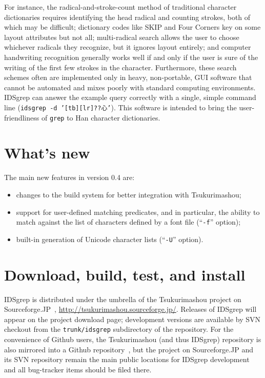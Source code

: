 \documentclass[twocolumn]{report}
\begin{document}
For instance, the radical-and-stroke-count method of traditional character
dictionaries requires identifying the head radical and counting strokes,
both of which may be difficult; dictionary codes like SKIP and Four Corners
key on some layout attributes but not all; multi-radical search allows the
user to choose whichever radicals they recognize, but it ignores layout
entirely; and computer handwriting recognition generally works well if and
only if the user is sure of the writing of the first few strokes in the
character.  Furthermore, these search schemes often are implemented only in
heavy, non-portable, GUI software that cannot be automated and mixes poorly
with standard computing environments.  IDSgrep can answer the example query
correctly with a single, simple command line (\texttt{idsgrep -d
'[tb][lr]??心'}).  This software is intended to bring the user-friendliness
of \texttt{grep} to Han character dictionaries.


\section{What's new}

The main new features in version 0.4 are:
\begin{itemize}
  \item changes to the build system for better integration with
    Tsukurimashou;
  \item support for user-defined matching predicates, and in particular, the
    ability to match against the list of characters defined by a font file
    (``\texttt{-f}'' option);
  \item built-in generation of Unicode character lists (``\texttt{-U}''
    option).
\end{itemize}


\section{Download, build, test, and install}

IDSgrep is distributed under the umbrella of the Tsukurimashou project on
Sourceforge.JP~\cite{Tsukurimashou},
\url{http://tsukurimashou.sourceforge.jp/}.  Releases of IDSgrep
will appear on the project download page; development versions are available
by SVN checkout from the \texttt{trunk/idsgrep} subdirectory of the
repository.  For the convenience of Github users, the Tsukurimashou (and
thus IDSgrep) repository is also mirrored into a Github
repository~\cite{TsukuGithub}, but the project on Sourceforge.JP and its SVN
repository remain the main public locations for IDSgrep development and all
bug-tracker items should be filed there.
\end{document}
